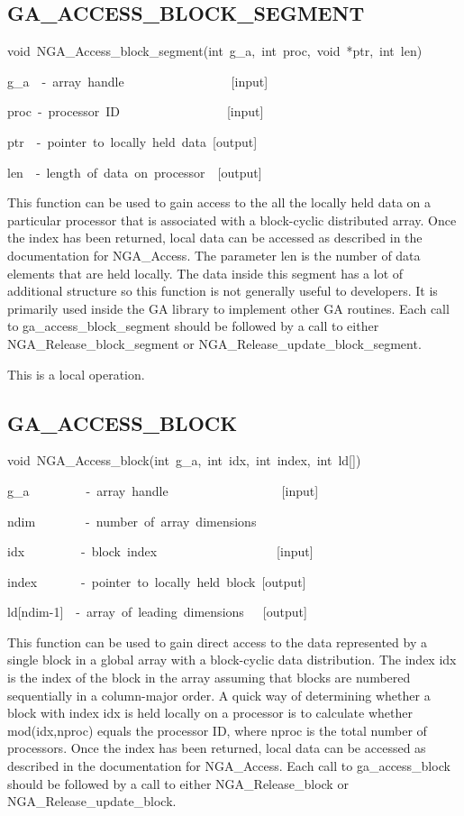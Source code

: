 \subsection*{\label{sub:GA_ACCESS_BLOCK_SEGMENT}GA\_ACCESS\_BLOCK\_SEGMENT}
\begin{lyxcode}
void~NGA\_Access\_block\_segment(int~g\_a,~int~proc,~void~{*}ptr,~int~len)



g\_a~~-~array~handle~~~~~~~~~~~~~~~~~{[}input{]}~

proc~-~processor~ID~~~~~~~~~~~~~~~~~{[}input{]}~

ptr~~-~pointer~to~locally~held~data~{[}output{]}~

len~~-~length~of~data~on~processor~~{[}output{]}
\end{lyxcode}
This function can be used to gain access to the all the locally held
data on a particular processor that is associated with a block-cyclic
distributed array. Once the index has been returned, local data can
be accessed as described in the documentation for NGA\_Access. The
parameter len is the number of data elements that are held locally.
The data inside this segment has a lot of additional structure so
this function is not generally useful to developers. It is primarily
used inside the GA library to implement other GA routines. Each call
to ga\_access\_block\_segment should be followed by a call to either
NGA\_Release\_block\_segment or NGA\_Release\_update\_block\_segment.

This is a local operation. 


\subsection*{\label{sub:GA_ACCESS_BLOCK}GA\_ACCESS\_BLOCK}
\begin{lyxcode}
void~NGA\_Access\_block(int~g\_a,~int~idx,~int~index,~int~ld{[}{]})



g\_a~~~~~~~~~-~array~handle~~~~~~~~~~~~~~~~~~{[}input{]}~

ndim~~~~~~~~-~number~of~array~dimensions~

idx~~~~~~~~~-~block~index~~~~~~~~~~~~~~~~~~~{[}input{]}~

index~~~~~~~-~pointer~to~locally~held~block~{[}output{]}~

ld{[}ndim-1{]}~~-~array~of~leading~dimensions~~~{[}output{]}
\end{lyxcode}
This function can be used to gain direct access to the data represented
by a single block in a global array with a block-cyclic data distribution.
The index idx is the index of the block in the array assuming that
blocks are numbered sequentially in a column-major order. A quick
way of determining whether a block with index idx is held locally
on a processor is to calculate whether mod(idx,nproc) equals the processor
ID, where nproc is the total number of processors. Once the index
has been returned, local data can be accessed as described in the
documentation for NGA\_Access. Each call to ga\_access\_block should
be followed by a call to either NGA\_Release\_block or NGA\_Release\_update\_block.

